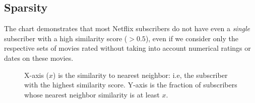 \documentclass[11pt]{article}
\begin{document}
\begin{appendix}
\section{Sparsity}
\label{appendix-sparsity}

The chart demonstrates that most Netflix subscribers do not have even
a \emph{single} subscriber with a high similarity score ($> 0.5$), even
if we consider only the respective sets of movies rated without taking
into account numerical ratings or dates on these movies.

\begin{figure}
\centering
\mbox{}
\caption{X-axis ($x$) is the similarity to nearest neighbor: i.e, the subscriber with the
highest similarity score. Y-axis is the fraction of subscribers whose nearest neighbor
similarity is at least $x$.\label{simchart}}
\centering

\end{figure}


\end{appendix}

%
\end{document}
